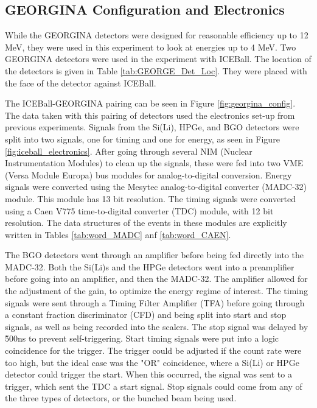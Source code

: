 

\subsection{GEORGINA Configuration and Electronics}
\label{sec:GEORGINA_electronics}

While the GEORGINA detectors were designed for reasonable efficiency up to 12 MeV, they were used in this experiment to look at energies up to 4 MeV. Two GEORGINA detectors were used in the experiment with ICEBall. The location of the detectors is given in Table \ref{tab:GEORGE_Det_Loc}. They were placed with the face of the detector against ICEBall.



The ICEBall-GEORGINA pairing can be seen in Figure \ref{fig:georgina_config}. The data taken with this pairing of detectors used the electronics set-up from previous experiments\citep{battaglia15:_iceball_176lu}. Signals from the Si(Li), HPGe, and BGO detectors were split into two signals, one for timing and one for energy, as seen in Figure \ref{fig:iceball_electronics}. After going through several NIM (Nuclear Instrumentation Modules) to clean up the signals, these were fed into two VME (Versa Module Europa) bus modules for analog-to-digital conversion. Energy signals were converted using the Mesytec analog-to-digital converter (MADC-32) module. This module has 13 bit resolution. The timing signals were converted using a Caen V775 time-to-digital converter (TDC) module, with 12 bit resolution. The data structures of the events in these modules are explicitly written in Tables \ref{tab:word_MADC} anf \ref{tab:word_CAEN}.





The BGO detectors went through an amplifier before being fed directly into the MADC-32. Both the Si(Li)s and the HPGe detectors went into a preamplifier before going into an amplifier, and then the MADC-32. The amplifier allowed for the adjustment of the gain, to optimize the energy regime of interest. The timing signals were sent through a Timing Filter Amplifier (TFA) before going through a constant fraction discriminator (CFD) and being split into start and stop signals, as well as being recorded into the scalers. The stop signal was delayed by \~500ns to prevent self-triggering. Start timing signals were put into a logic coincidence for the trigger. The trigger could be adjusted if the count rate were too high, but the ideal case was the "OR" coincidence, where a Si(Li) or HPGe detector could trigger the start. When this occurred, the signal was sent to a trigger, which sent the TDC a start signal. Stop signals could come from any of the three types of detectors, or the bunched beam being used.

